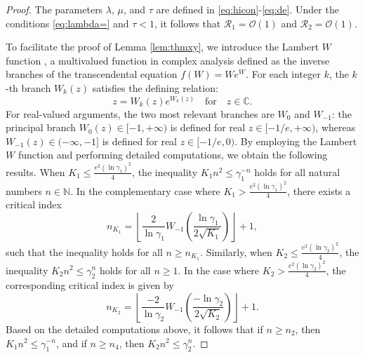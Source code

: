 \documentclass[11pt,reqno,twoside]{amsart}
\theoremstyle{definition}
\theoremstyle{remark}
\numberwithin{equation}{section}
\begin{document}
\begin{proof}
	The parameters \(\lambda\), \(\mu\), and \(\tau\) are defined in \eqref{eq:hicon}-\eqref{eq:de}. Under the conditions \eqref{eq:lambda=} and  $\tau < 1$, it follows that $\mathcal{R}_{1} = \mathcal{O}(1)$ and $\mathcal{R}_{2} = \mathcal{O}(1)$. 
	
	To facilitate the proof of Lemma \ref{lem:thmxy}, we introduce the Lambert $W$ function \cite{RGD}, a multivalued function in complex analysis defined as the inverse branches of the transcendental equation $f(W) = We^W$. For each integer $k$, the $k$-th branch $W_k(z)$ satisfies the defining relation:
	\[ z = W_k(z)e^{W_k(z)} \quad \text{for} \quad z \in \mathbb{C}. \]
	For real-valued arguments, the two most relevant branches are \( W_0 \) and \( W_{-1} \): the principal branch \( W_0(z) \in [-1, +\infty) \) is defined for real \( z \in [-1/e, +\infty) \), whereas \( W_{-1}(z) \in (-\infty, -1] \) is defined for real \( z \in [-1/e, 0) \). By employing the Lambert \( W \) function and performing detailed computations, we obtain the following results. When \( K_1 \leq \frac{e^2(\ln \gamma_1)^2}{4} \), the inequality \( K_1 n^2 \leq \gamma_1^{-n} \) holds for all natural numbers \( n \in \mathbb{N} \). In the complementary case where \( K_1 > \frac{e^2(\ln \gamma_1)^2}{4} \), there exists a critical index
	\[
	n_{K_1} = \left\lfloor \frac{2}{\ln \gamma_1} W_{-1} \left( \frac{\ln \gamma_1}{2\sqrt{K_1}} \right) \right\rfloor + 1,
	\]
	such that the inequality holds for all \( n \geq n_{K_1} \). Similarly, when \( K_2 \leq \frac{e^2(\ln \gamma_2)^2}{4} \), the inequality \( K_2 n^2 \leq \gamma_2^n \) holds for all \( n \geq 1 \). In the case where \( K_2 > \frac{e^2(\ln \gamma_2)^2}{4} \), the corresponding critical index is given by
	\[
	n_{K_2} = \left\lfloor \frac{-2}{\ln \gamma_2} W_{-1} \left( \frac{-\ln \gamma_2}{2\sqrt{K_2}} \right) \right\rfloor + 1.
	\]
	Based on the detailed computations above, it follows that if \( n \geq n_2 \), then \( K_1 n^2 \leq \gamma_1^{-n} \), and if \( n \geq n_4 \), then \( K_2 n^2 \leq \gamma_2^{n} \).
\end{proof}
\end{document}
